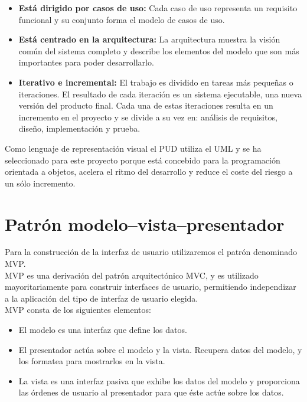 \documentclass[12pt, a4paper]{book}
\begin{document}
\begin{itemize}
	\item \textbf{Está dirigido por casos de uso:} Cada caso de uso representa un requisito funcional y su conjunto forma el modelo de casos de uso.
	\item \textbf{Está centrado en la arquitectura:} La arquitectura muestra la visión común del sistema completo y describe los elementos del modelo que son más importantes para poder desarrollarlo.
	\item \textbf{Iterativo e incremental: } El trabajo es dividido en tareas más pequeñas o iteraciones. El resultado de cada iteración es un sistema ejecutable, una nueva versión del producto final. Cada una de estas iteraciones resulta en un incremento en el proyecto y se divide a su vez en: análisis de requisitos, diseño, implementación y prueba.
\end{itemize}

Como lenguaje de representación visual el \gls{PUD} utiliza el \gls{UML} y se ha seleccionado para este proyecto porque está concebido para la programación orientada a objetos, acelera el ritmo del desarrollo y reduce el coste del riesgo a un sólo incremento.   

\newpage 

\section{Patrón modelo–vista–presentador}

Para la construcción de la interfaz de usuario utilizaremos el patrón denominado \gls{MVP}.\\


\gls{MVP} es una derivación del patrón arquitectónico \gls{MVC}, y es utilizado mayoritariamente para construir interfaces de usuario, permitiendo independizar a la aplicación del tipo de interfaz de usuario elegida.\\

\gls{MVP} consta de los siguientes elementos:


\begin{itemize}
	\item El modelo es una interfaz que define los datos.
	\item El presentador actúa sobre el modelo y la vista. Recupera datos del modelo, y los formatea para mostrarlos en la vista.
	\item La vista es una interfaz pasiva que exhibe los datos del modelo y proporciona las órdenes de usuario al presentador para que éste actúe sobre los datos.
\end{itemize}
\end{document}
